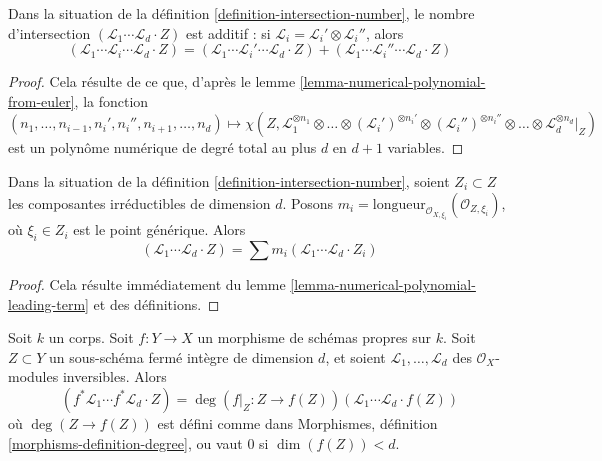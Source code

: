 \begin{lemma}
\label{lemma-intersection-number-additive}
Dans la situation de la définition \ref{definition-intersection-number},
le nombre d'intersection
$(\mathcal{L}_1 \cdots \mathcal{L}_d \cdot Z)$
est additif : si $\mathcal{L}_i = \mathcal{L}_i' \otimes \mathcal{L}_i''$,
alors
$$
(\mathcal{L}_1 \cdots \mathcal{L}_i \cdots \mathcal{L}_d \cdot Z) =
(\mathcal{L}_1 \cdots \mathcal{L}_i' \cdots \mathcal{L}_d \cdot Z) +
(\mathcal{L}_1 \cdots \mathcal{L}_i'' \cdots \mathcal{L}_d \cdot Z)
$$
\end{lemma}

\begin{proof}
Cela résulte de ce que, d'après le lemme \ref{lemma-numerical-polynomial-from-euler},
la fonction
$$
(n_1, \ldots, n_{i - 1}, n_i', n_i'', n_{i + 1}, \ldots, n_d)
\mapsto
\chi(Z, \mathcal{L}_1^{\otimes n_1} \otimes
\ldots \otimes (\mathcal{L}_i')^{\otimes n_i'} \otimes
(\mathcal{L}_i'')^{\otimes n_i''} \otimes \ldots \otimes
\mathcal{L}_d^{\otimes n_d}|_Z)
$$
est un polynôme numérique de degré total au plus $d$ en $d + 1$ variables.
\end{proof}

\begin{lemma}
\label{lemma-intersection-number-in-terms-of-components}
Dans la situation de la définition \ref{definition-intersection-number},
soient $Z_i \subset Z$ les composantes irréductibles de dimension $d$. Posons
$m_i = \text{longueur}_{\mathcal{O}_{X, \xi_i}}(\mathcal{O}_{Z, \xi_i})$,
où $\xi_i \in Z_i$ est le point générique. Alors
$$
(\mathcal{L}_1 \cdots \mathcal{L}_d \cdot Z) =
\sum m_i(\mathcal{L}_1 \cdots \mathcal{L}_d \cdot Z_i)
$$
\end{lemma}

\begin{proof}
Cela résulte immédiatement du lemme \ref{lemma-numerical-polynomial-leading-term}
et des définitions.
\end{proof}

\begin{lemma}
\label{lemma-intersection-number-and-pullback}
Soit $k$ un corps. Soit $f : Y \to X$ un morphisme de schémas propres sur $k$.
Soit $Z \subset Y$ un sous-schéma fermé intègre de dimension $d$, et soient
$\mathcal{L}_1, \ldots, \mathcal{L}_d$ des $\mathcal{O}_X$-modules inversibles.
Alors
$$
(f^*\mathcal{L}_1 \cdots f^*\mathcal{L}_d \cdot Z) =
\deg(f|_Z : Z \to f(Z)) (\mathcal{L}_1 \cdots \mathcal{L}_d \cdot f(Z))
$$
où $\deg(Z \to f(Z))$ est défini comme dans
Morphismes, définition \ref{morphisms-definition-degree},
ou vaut $0$ si $\dim(f(Z)) < d$.
\end{lemma}

